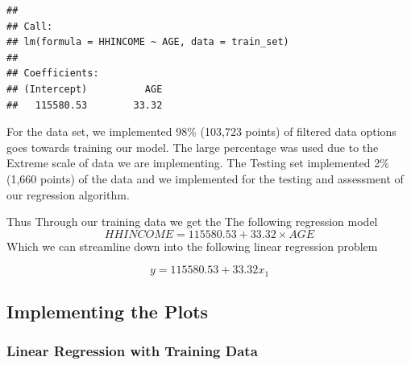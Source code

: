 \documentclass[
]{article}
\newenvironment{Shaded}{\begin{snugshade}}{\end{snugshade}}
\newcommand{\AttributeTok}[1]{\textcolor[rgb]{0.13,0.29,0.53}{#1}}
\newcommand{\CommentTok}[1]{\textcolor[rgb]{0.56,0.35,0.01}{\textit{#1}}}
\newcommand{\FunctionTok}[1]{\textcolor[rgb]{0.13,0.29,0.53}{\textbf{#1}}}
\newcommand{\NormalTok}[1]{#1}
\newcommand{\OtherTok}[1]{\textcolor[rgb]{0.56,0.35,0.01}{#1}}
\newcommand{\SpecialCharTok}[1]{\textcolor[rgb]{0.81,0.36,0.00}{\textbf{#1}}}
\begin{document}
\begin{Shaded}
\end{Shaded}

\begin{verbatim}
## 
## Call:
## lm(formula = HHINCOME ~ AGE, data = train_set)
## 
## Coefficients:
## (Intercept)          AGE  
##   115580.53        33.32
\end{verbatim}

For the data set, we implemented 98\% (103,723 points) of filtered data
options goes towards training our model. The large percentage was used
due to the Extreme scale of data we are implementing. The Testing set
implemented 2\% (1,660 points) of the data and we implemented for the
testing and assessment of our regression algorithm.

Thus Through our training data we get the The following regression model
\[
HHINCOME = 115580.53 + 33.32 \times AGE
\] Which we can streamline down into the following linear regression
problem

\[ 
y = 115580.53 + 33.32 x_1
\]

\subsection{Implementing the Plots}\label{implementing-the-plots}

\subsubsection{Linear Regression with Training
Data}\label{linear-regression-with-training-data}
\end{document}
